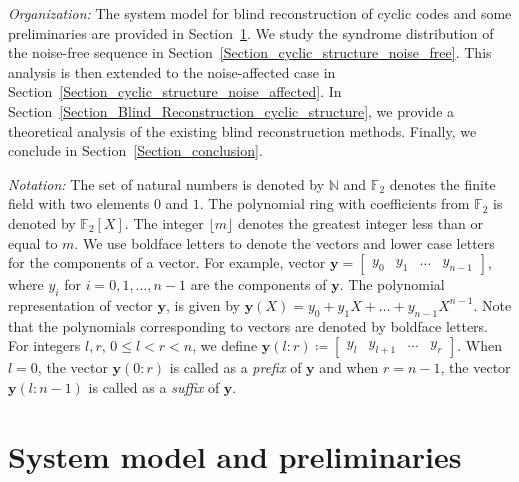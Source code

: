 \documentclass[10pt,journal]{IEEEtran}
\begin{document}
\textit{Organization:}
The system model for blind reconstruction of cyclic codes and some preliminaries are provided in Section~\ref{Section_System_model}.
We study the syndrome distribution of the noise-free sequence in Section~\ref{Section_cyclic_structure_noise_free}.
This analysis is then extended to the noise-affected case in Section~\ref{Section_cyclic_structure_noise_affected}.
In Section~\ref{Section_Blind_Reconstruction_cyclic_structure}, we provide a theoretical analysis of the existing blind reconstruction methods.
Finally, we conclude in Section~\ref{Section_conclusion}.

\textit{Notation:} 
The set of natural numbers is denoted by $\mathbb{N}$ and $\mathbb{F}_2$ denotes the finite field with two elements $0$ and $1$.
The polynomial ring with coefficients from $\mathbb{F}_2$ is denoted by $\mathbb{F}_2[X]$.
The integer $\lfloor m \rfloor$ denotes the greatest integer less than or equal to $m$.
We use boldface letters to denote the vectors and lower case letters for the components of a vector. 
For example, vector $\mathbf{y} = \begin{bmatrix} y_{0} & y_1 & \ldots & y_{n-1} \end{bmatrix}$, where $y_i$ for $i = 0, 1, \ldots, n-1$
are the components of $\mathbf{y}$.
The polynomial representation of vector $\mathbf{y}$, is given by $\mathbf{y}(X) = y_{0} + y_{1}X + \ldots + y_{n-1}X^{n-1}$.
Note that the polynomials corresponding to vectors are denoted by boldface letters.
% 
For integers $l,r$, $0 \leq l < r < n$, we define $\mathbf{y}(l:r) \coloneqq \begin{bmatrix} y_{l} & y_{l+1} & \ldots & y_{r} \end{bmatrix}$.
When $l=0$, the vector $\mathbf{y}(0:r)$ is called as a \textit{prefix} of $\mathbf{y}$ and 
when $r=n-1$, the vector $\mathbf{y}(l:n-1)$ is called as a \textit{suffix} of $\mathbf{y}$.

\section{System model and preliminaries} 
\label{Section_System_model}
\end{document}
